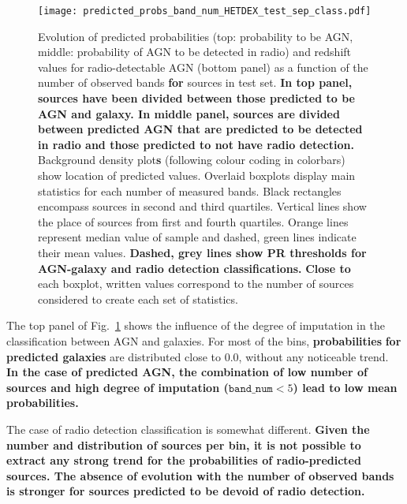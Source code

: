 \documentclass{aa}
\begin{document}
\begin{figure}
  \centering
    \texttt{[image: predicted\_probs\_band\_num\_HETDEX\_test\_sep\_class.pdf]}
  \caption{Evolution of predicted probabilities (top: probability to be AGN, middle: probability of AGN to be detected in radio) and redshift values for radio-detectable AGN (bottom panel) as a function of the number of observed bands \textbf{for} sources in test set. \textbf{In top panel, sources have been divided between those predicted to be AGN and galaxy. In middle panel, sources are divided between predicted AGN that are predicted to be detected in radio and those predicted to not have radio detection.} Background density plot\textbf{s} (following colour coding in colorbars) show location of predicted values. Overlaid boxplots display main statistics for each number of measured bands. Black rectangles encompass sources in second and third quartiles. Vertical lines show the place of sources from first and fourth quartiles. Orange lines represent median value of sample and dashed, green lines indicate their mean values. \textbf{Dashed, grey lines show PR thresholds for AGN-galaxy and radio detection classifications.} \textbf{Close to} each boxplot, written values correspond to the number of sources considered to create each set of statistics.}
  \label{fig:probs_band_num_test}
\end{figure}


The top panel of Fig.~\ref{fig:probs_band_num_test} shows the influence of the degree of imputation in the classification between AGN and galaxies. For most of the bins, \textbf{probabilities} \textbf{for predicted galaxies} are distributed close to $0.0$, without any noticeable trend. \textbf{In the case of predicted AGN, the combination of low number of sources and high degree of imputation ($\mathtt{band\_num} < 5$) lead to low mean probabilities.}

The case of radio detection classification is somewhat different. \textbf{Given the number and distribution of sources per bin, it is not possible to extract any strong trend for the probabilities of radio-predicted sources. The absence of evolution with the number of observed bands is stronger for sources predicted to be devoid of radio detection.}
\end{document}
